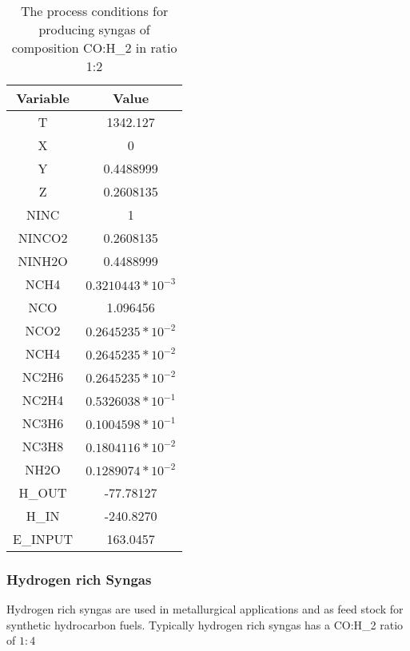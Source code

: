 \documentclass[journal=iecred,manuscript=article]{achemso}
\begin{document}
\FloatBarrier
\begin{table}[H]
\caption{The process conditions for producing syngas of composition CO:H_2 in ratio 1:2} 
\centering
\begin{tabular}{|c|c|}
\hline\hline %
Variable & Value \\ 
[1ex] %
\hline %
T	& 1342.127 \\
\hline
X	 & 0 \\
\hline
Y	& 0.4488999 \\
\hline
Z	& 0.2608135 \\
\hline
NINC	& 1 \\
\hline
NINCO2	& 0.2608135 \\
\hline
NINH2O	& 0.4488999 \\
\hline
NCH4 &	$0.3210443*10^{-3}$ \\
\hline
NCO	& 1.096456 \\
\hline
NCO2	& $0.2645235*10^{-2}$ \\
\hline
NCH4	& $0.2645235*10^{-2}$ \\
\hline
NC2H6	& $0.2645235*10^{-2}$ \\
\hline
NC2H4	& $0.5326038*10^{-1}$ \\
\hline
NC3H6	& $0.1004598*10^{-1}$ \\
\hline
NC3H8	& $0.1804116*10^{-2}$ \\
\hline
NH2O	& $0.1289074*10^{-2}$ \\
\hline
H_{OUT}	& -77.78127 \\
\hline
H_{IN}	& -240.8270 \\
\hline
E_{INPUT}	& 163.0457 \\
\hline 

\end{tabular}
\end{table}
\FloatBarrier

\newpage
\subsubsection{Hydrogen rich Syngas}
Hydrogen rich syngas are used in metallurgical applications and as feed stock for synthetic hydrocarbon fuels. Typically hydrogen rich syngas has a CO:H_2 ratio of $1:4$
\end{document}
